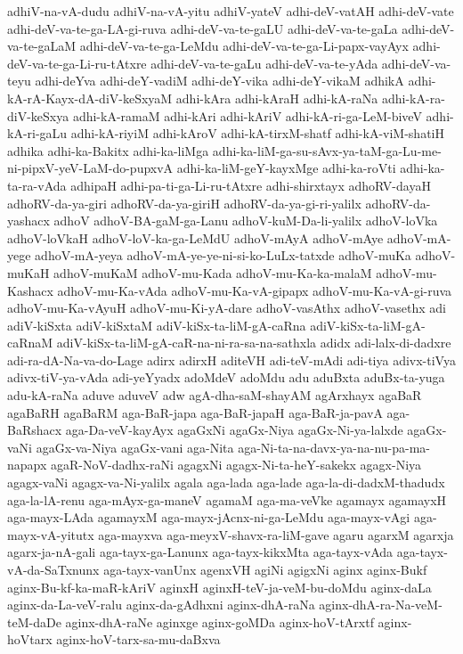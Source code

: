 {adhiV-na-vA-dudu
adhiV-na-vA-yitu
adhiV-yateV
adhi-deV-vatAH
adhi-deV-vate
adhi-deV-va-te-ga-LA-gi-ruva
adhi-deV-va-te-gaLU
adhi-deV-va-te-gaLa
adhi-deV-va-te-gaLaM
adhi-deV-va-te-ga-LeMdu
adhi-deV-va-te-ga-Li-papx-vayAyx
adhi-deV-va-te-ga-Li-ru-tAtxre
adhi-deV-va-te-gaLu
adhi-deV-va-te-yAda
adhi-deV-va-teyu
adhi-deYva
adhi-deY-vadiM
adhi-deY-vika
adhi-deY-vikaM
adhikA
adhi-kA-rA-Kayx-dA-diV-keSxyaM
adhi-kAra
adhi-kAraH
adhi-kA-raNa
adhi-kA-ra-diV-keSxya
adhi-kA-ramaM
adhi-kAri
adhi-kAriV
adhi-kA-ri-ga-LeM-biveV
adhi-kA-ri-gaLu
adhi-kA-riyiM
adhi-kAroV
adhi-kA-tirxM-shatf
adhi-kA-viM-shatiH
adhika
adhi-ka-Bakitx
adhi-ka-liMga
adhi-ka-liM-ga-su-sAvx-ya-taM-ga-Lu-me-ni-pipxV-yeV-LaM-do-pupxvA
adhi-ka-liM-geY-kayxMge
adhi-ka-roVti
adhi-ka-ta-ra-vAda
adhipaH
adhi-pa-ti-ga-Li-ru-tAtxre
adhi-shirxtayx
adhoRV-dayaH
adhoRV-da-ya-giri
adhoRV-da-ya-giriH
adhoRV-da-ya-gi-ri-yalilx
adhoRV-da-yashacx
adhoV
adhoV-BA-gaM-ga-Lanu
adhoV-kuM-Da-li-yalilx
adhoV-loVka
adhoV-loVkaH
adhoV-loV-ka-ga-LeMdU
adhoV-mAyA
adhoV-mAye
adhoV-mA-yege
adhoV-mA-yeya
adhoV-mA-ye-ye-ni-si-ko-LuLx-tatxde
adhoV-muKa
adhoV-muKaH
adhoV-muKaM
adhoV-mu-Kada
adhoV-mu-Ka-ka-malaM
adhoV-mu-Kashacx
adhoV-mu-Ka-vAda
adhoV-mu-Ka-vA-gipapx
adhoV-mu-Ka-vA-gi-ruva
adhoV-mu-Ka-vAyuH
adhoV-mu-Ki-yA-dare
adhoV-vasAthx
adhoV-vasethx
adi
adiV-kiSxta
adiV-kiSxtaM
adiV-kiSx-ta-liM-gA-caRna
adiV-kiSx-ta-liM-gA-caRnaM
adiV-kiSx-ta-liM-gA-caR-na-ni-ra-sa-na-sathxla
adidx
adi-lalx-di-dadxre
adi-ra-dA-Na-va-do-Lage
adirx
adirxH
aditeVH
adi-teV-mAdi
adi-tiya
adivx-tiVya
adivx-tiV-ya-vAda
adi-yeYyadx
adoMdeV
adoMdu
adu
aduBxta
aduBx-ta-yuga
adu-kA-raNa
aduve
aduveV
adw
agA-dha-saM-shayAM
agArxhayx
agaBaR
agaBaRH
agaBaRM
aga-BaR-japa
aga-BaR-japaH
aga-BaR-ja-pavA
aga-BaRshacx
aga-Da-veV-kayAyx
agaGxNi
agaGx-Niya
agaGx-Ni-ya-lalxde
agaGx-vaNi
agaGx-va-Niya
agaGx-vani
aga-Nita
aga-Ni-ta-na-davx-ya-na-nu-pa-ma-napapx
agaR-NoV-dadhx-raNi
agagxNi
agagx-Ni-ta-heY-sakekx
agagx-Niya
agagx-vaNi
agagx-va-Ni-yalilx
agala
aga-lada
aga-lade
aga-la-di-dadxM-thadudx
aga-la-lA-renu
aga-mAyx-ga-maneV
agamaM
aga-ma-veVke
agamayx
agamayxH
aga-mayx-LAda
agamayxM
aga-mayx-jAcnx-ni-ga-LeMdu
aga-mayx-vAgi
aga-mayx-vA-yitutx
aga-mayxva
aga-meyxV-shavx-ra-liM-gave
agaru
agarxM
agarxja
agarx-ja-nA-gali
aga-tayx-ga-Lanunx
aga-tayx-kikxMta
aga-tayx-vAda
aga-tayx-vA-da-SaTxnunx
aga-tayx-vanUnx
agenxVH
agiNi
agigxNi
aginx
aginx-Bukf
aginx-Bu-kf-ka-maR-kAriV
aginxH
aginxH-teV-ja-veM-bu-doMdu
aginx-daLa
aginx-da-La-veV-ralu
aginx-da-gAdhxni
aginx-dhA-raNa
aginx-dhA-ra-Na-veM-teM-daDe
aginx-dhA-raNe
aginxge
aginx-goMDa
aginx-hoV-tArxtf
aginx-hoVtarx
aginx-hoV-tarx-sa-mu-daBxva
}
